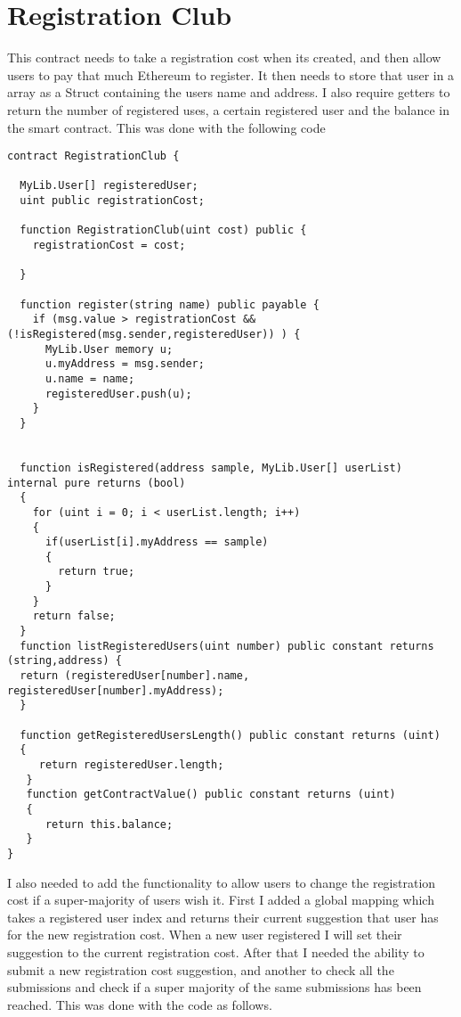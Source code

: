 \section{Registration Club}
This contract needs to take a registration cost when its created, and then allow users to pay that much Ethereum to register. It then needs to store that user in a array as a Struct containing the users name and address. I also require getters to return the number of registered uses, a certain registered user and the balance in the smart contract. This was done with the following code 
\begin{lstlisting}
contract RegistrationClub {
  
  MyLib.User[] registeredUser;
  uint public registrationCost;
  
  function RegistrationClub(uint cost) public {
    registrationCost = cost;
    
  }

  function register(string name) public payable {
    if (msg.value > registrationCost && (!isRegistered(msg.sender,registeredUser)) ) {
      MyLib.User memory u;
      u.myAddress = msg.sender;
      u.name = name;
      registeredUser.push(u);
    }
  }
  
  
  function isRegistered(address sample, MyLib.User[] userList) internal pure returns (bool)
  {
    for (uint i = 0; i < userList.length; i++)
    {
      if(userList[i].myAddress == sample)
      {
        return true;
      }
    }
    return false;
  }
  function listRegisteredUsers(uint number) public constant returns (string,address) {
  return (registeredUser[number].name, registeredUser[number].myAddress);
  }
    
  function getRegisteredUsersLength() public constant returns (uint)
  {
     return registeredUser.length;
   }
   function getContractValue() public constant returns (uint)
   {
      return this.balance;
   }
}
\end{lstlisting}
I also needed to add the functionality to allow users to change the registration cost if a super-majority of users wish it.  First I added a global mapping which takes a registered user index and returns their current suggestion that user has for the new registration cost. When a new user registered I will set their suggestion to the current registration cost. After that I needed the ability to submit a new registration cost suggestion, and another to check all the submissions and check if a super majority of the same submissions has been reached. This was done with the code as follows.
